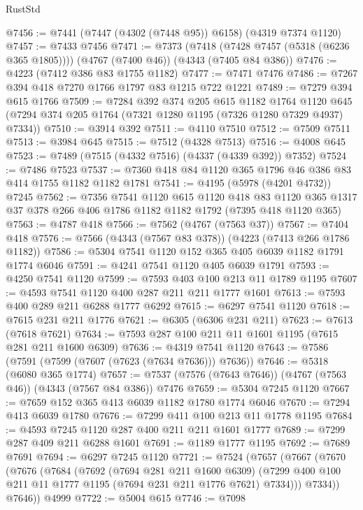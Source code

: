 \begin{lexlean}{RustStd}
\begin{coremodule}
@7456 := @7441 (@7447 (@4302 (@7448 @95)) @6158) (@4319 @7374 @1120)
@7457 := @7433 @7456
@7471 := @7373
    (@7418 (@7428 @7457 (@5318 (@6236 @365 @1805))))
    (@4767 (@7400 @46))
    (@4343 (@7405 @84 @386))
@7476 := @4223 (@7412 @386 @83 @1755 @1182)
@7477 := @7471 @7476
@7486 := @7267 @394 @418 @7270 @1766 @1797 @83 @1215 @722 @1221
@7489 := @7279 @394 @615 @1766
@7509 := @7284
    @392
    @374
    @205
    @615
    @1182
    @1764
    @1120
    @645
    (@7294 @374 @205 @1764 (@7321 @1280 @1195 (@7326 @1280 @7329 @4937) @7334))
@7510 := @3914 @392
@7511 := @4110 @7510
@7512 := @7509 @7511
@7513 := @3984 @645
@7515 := @7512 (@4328 @7513)
@7516 := @4008 @645
@7523 := @7489 (@7515 (@4332 @7516) (@4337 (@4339 @392)) @7352)
@7524 := @7486 @7523
@7537 := @7360 @418 @84 @1120 @365 @1796 @46 @386 @83 @414 @1755 @1182 @1182 @1781
@7541 := @4195 (@5978 (@4201 @4732)) @7245
@7562 := @7356
    @7541
    @1120
    @615
    @1120
    @418
    @83
    @1120
    @365
    @1317
    @37
    @378
    @266
    @406
    @1786
    @1182
    @1182
    @1792
    (@7395 @418 @1120 @365)
@7563 := @4787 @418
@7566 := @7562 (@4767 (@7563 @37))
@7567 := @7404 @418
@7576 := @7566 (@4343 (@7567 @83 @378)) (@4223 (@7413 @266 @1786 @1182))
@7586 := @5304 @7541 @1120 @152 @365 @405 @6039 @1182 @1791 @1774 @6046
@7591 := @4241 @7541 @1120 @405 @6039 @1791
@7593 := @4250 @7541 @1120
@7599 := @7593 @403 @100 @213 @11 @1789 @1195
@7607 := @4593 @7541 @1120 @400 @287 @211 @211 @1777 @1601
@7613 := @7593 @400 @289 @211 @6288 @1777 @6292
@7615 := @6297 @7541 @1120
@7618 := @7615 @231 @211 @1776
@7621 := @6305 (@6306 @231 @211)
@7623 := @7613 (@7618 @7621)
@7634 := @7593 @287 @100 @211 @11 @1601 @1195 (@7615 @281 @211 @1600 @6309)
@7636 := @4319 @7541 @1120
@7643 := @7586 (@7591 (@7599 (@7607 (@7623 (@7634 @7636))) @7636))
@7646 := @5318 (@6080 @365 @1774)
@7657 := @7537 (@7576 (@7643 @7646)) (@4767 (@7563 @46)) (@4343 (@7567 @84 @386)) @7476
@7659 := @5304 @7245 @1120
@7667 := @7659 @152 @365 @413 @6039 @1182 @1780 @1774 @6046
@7670 := @7294 @413 @6039 @1780
@7676 := @7299 @411 @100 @213 @11 @1778 @1195
@7684 := @4593 @7245 @1120 @287 @400 @211 @211 @1601 @1777
@7689 := @7299 @287 @409 @211 @6288 @1601
@7691 := @1189 @1777 @1195
@7692 := @7689 @7691
@7694 := @6297 @7245 @1120
@7721 := @7524
    (@7657
      (@7667
        (@7670
          (@7676
            (@7684
              (@7692
                (@7694 @281 @211 @1600 @6309)
                (@7299 @400 @100 @211 @11 @1777 @1195 (@7694 @231 @211 @1776 @7621) @7334)))
            @7334))
        @7646))
    @4999
@7722 := @5004 @615
@7746 := @7098

\end{coremodule}
\end{lexlean}
